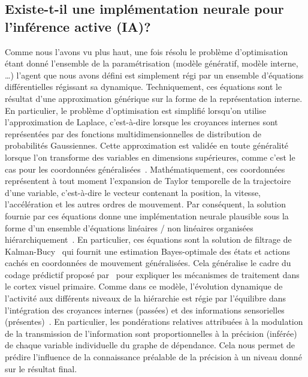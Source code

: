 \documentclass[11pt,french,a4paper,oneside]{article}%
\begin{document}
\subsection{Existe-t-il une implémentation neurale pour l'inférence
active (IA)?}
Comme nous l'avons vu plus haut, une fois résolu le problème
d'optimisation étant donné l'ensemble de la paramétrisation (modèle génératif, modèle interne,
\ldots) l'agent que nous avons défini est simplement régi par un
ensemble d'équations différentielles régissant sa dynamique.
Techniquement, ces équations sont le résultat d'une approximation
générique sur la forme de la représentation interne. En particulier, le
problème d'optimisation est simplifié lorsqu'on utilise l'approximation
de Laplace, c'est-à-dire lorsque les croyances internes sont
représentées par des fonctions multidimensionnelles de distribution de
probabilités Gaussiennes. Cette approximation est validée en toute généralité lorsque
l'on transforme des variables en dimensions supérieures, comme c'est le
cas pour les coordonnées généralisées~\citep{Friston10generalized}.
Mathématiquement, ces
coordonnées représentent à tout moment l'expansion de Taylor temporelle de la
trajectoire d'une variable, c'est-à-dire le vecteur contenant
la position, la vitesse, l'accélération et les autres ordres de
mouvement. Par conséquent, la solution fournie par ces équations donne
une implémentation neurale plausible sous la forme d'un ensemble
d'équations linéaires / non linéaires organisées hiérarchiquement~\citep{Heeger17}. En particulier, ces équations sont la solution de
filtrage de Kalman-Bucy~\citep{Kalman60} qui fournit une estimation
Bayes-optimale des états et actions cachés en coordonnées de mouvement
généralisées. Cela généralise le cadre du codage prédictif proposé par~\citet{Rao99}
 pour expliquer les mécanismes de traitement dans
le cortex visuel primaire. Comme dans ce modèle, l'évolution dynamique
de l'activité aux différents niveaux de la hiérarchie est régie par
l'équilibre dans l'intégration des croyances internes (passées) et des
informations sensorielles (présentes)~\citep{Heeger17}. En particulier, les
pondérations relatives attribuées à la modulation de la transmission de
l'information sont proportionnelles à la précision (inférée) de chaque
variable individuelle du graphe de dépendance. Cela nous permet de
prédire l'influence de la connaissance préalable de la précision à un
niveau donné sur le résultat final.
\end{document}
